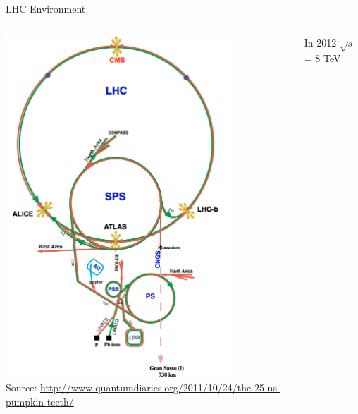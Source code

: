 \begin{frame}{LHC Environment}
\begin{columns}
\begin{column}{0.5\textwidth}
\begin{center}
\includegraphics[width=0.79\textwidth]{images/cern-acc.png}\\
{\fontsize{.1cm}{.001em}\selectfont Source: \url{http://www.quantumdiaries.org/2011/10/24/the-25-ns-pumpkin-teeth/}}
\end{center}
\end{column}
\begin{column}{0.5\textwidth}
\begin{center}
In 2012 $\sqrt{s}$ = 8 TeV\\
\vspace{.8em}

\end{center}
\end{column}
\end{columns}
\end{frame}
